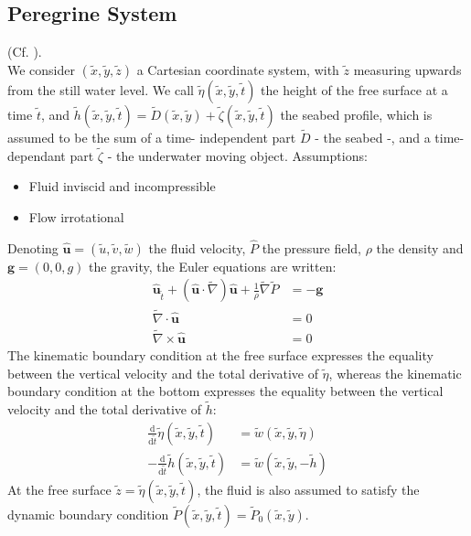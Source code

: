 \documentclass[11pt,a4paper]{article}
\begin{document}
		\subsection{Peregrine System}
			(Cf. \cite{DM2013}).\\ We consider $(\tilde{x},\tilde{y},\tilde{z})$ a Cartesian 
			coordinate system, with $\tilde{z}$ measuring upwards from the still water 
			level. We call $\tilde{\eta}(\tilde{x},\tilde{y},\tilde{t})$ the height of the 
			free surface at a time $\tilde{t}$, and $\tilde{h}(\tilde{x},\tilde{y},
			\tilde{t}) = \tilde{D}(\tilde{x},\tilde{y}) + \tilde{\zeta}(\tilde{x},\tilde{y},
			\tilde{t})$ the seabed profile, which is assumed to be the sum of a time-
			independent part $\tilde{D}$ - the seabed -, and a time-dependant part 
			$\tilde{\zeta}$ - the underwater moving object.
			Assumptions:
			\begin{itemize}
				\item Fluid inviscid and incompressible
				\item Flow irrotational
			\end{itemize}
			Denoting $\mathbf{\hat{u}} = (\tilde{u},\tilde{v}, \tilde{w})$ the fluid 
			velocity, $\hat{P}$ the pressure field, $\rho$ the density and $\mathbf{g} = 
			(0,0,g)$ the gravity, the Euler equations are written: 
			\begin{align}
						\displaystyle \mathbf{\hat{u}}_{\tilde{t}} + (\mathbf{\hat{u}} \cdot \tilde{\nabla}) \mathbf{\hat{u}} + \frac{1}{\rho} \tilde{\nabla}\tilde{P} &=  -\mathbf{g} \label{Euler1} \\
						\tilde{\nabla} \cdot \mathbf{\hat{u}} & = 0 \\
						\tilde{\nabla} \times \mathbf{\hat{u}} & = 0 \label{Euler3}
			\end{align}
			The kinematic boundary condition at the free surface expresses the equality between the vertical velocity and the total derivative of $\tilde{\eta}$, whereas the kinematic boundary condition at the bottom expresses the equality between the vertical velocity and the total derivative of $\tilde{h}$:
			\begin{align}
				\frac{\mathrm{d}}{\mathrm{d}\tilde{t}} \tilde{\eta}(\tilde{x},\tilde{y},\tilde{t}) & = \tilde{w}(\tilde{x},\tilde{y},\tilde{\eta}) \label{BC1} \\
				-\frac{\mathrm{d}}{\mathrm{d}\tilde{t}} \tilde{h}(\tilde{x},\tilde{y},\tilde{t}) & = \tilde{w}(\tilde{x},\tilde{y},-\tilde{h}) \label{BC2}
			\end{align}
			At the free surface $\tilde{z} = \tilde{\eta}(\tilde{x},\tilde{y},\tilde{t})$,	the fluid is also assumed to satisfy the dynamic boundary condition $\tilde{P}(\tilde{x},\tilde{y},\tilde{t}) = \tilde{P}_0(\tilde{x},\tilde{y})$.
			
\end{document}
